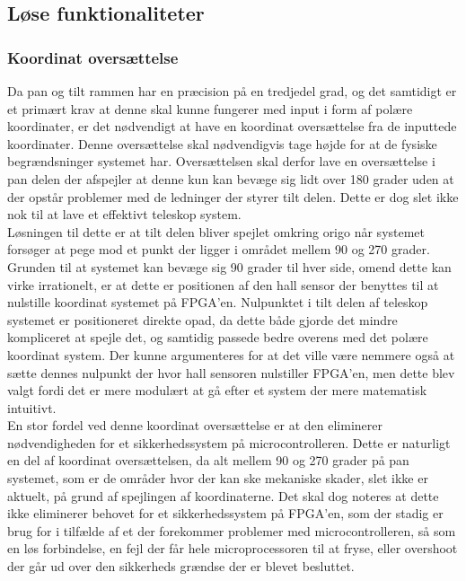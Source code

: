 \subsection{Løse funktionaliteter}

\subsubsection{Koordinat oversættelse}

Da pan og tilt rammen har en præcision på en tredjedel grad, og det samtidigt er et primært krav at denne skal kunne fungerer med input i form af polære koordinater, er det nødvendigt at have en koordinat oversættelse fra de inputtede koordinater. Denne oversættelse skal nødvendigvis tage højde for at de fysiske begrændsninger systemet har. Oversættelsen skal derfor lave en oversættelse i pan delen der afspejler at denne kun kan bevæge sig lidt over 180 grader uden at der opstår problemer med de ledninger der styrer tilt delen. Dette er dog slet ikke nok til at lave et effektivt teleskop system.
\\
Løsningen til dette er at tilt delen bliver spejlet omkring origo når systemet forsøger at pege mod et punkt der ligger i området mellem 90 og 270 grader. Grunden til at systemet kan bevæge sig 90 grader til hver side, omend dette kan virke irrationelt, er at dette er positionen af den hall sensor der benyttes til at nulstille koordinat systemet på FPGA'en. Nulpunktet i tilt delen af teleskop systemet er positioneret direkte opad, da dette både gjorde det mindre kompliceret at spejle det, og samtidig passede bedre overens med det polære koordinat system. Der kunne argumenteres for at det ville være nemmere også at sætte dennes nulpunkt der hvor hall sensoren nulstiller FPGA'en, men dette blev valgt fordi det er mere modulært at gå efter et system der mere matematisk intuitivt.
\\
En stor fordel ved denne koordinat oversættelse er at den eliminerer nødvendigheden for et sikkerhedssystem på microcontrolleren. Dette er naturligt en del af koordinat oversættelsen, da alt mellem 90 og 270 grader på pan systemet, som er de områder hvor der kan ske mekaniske skader, slet ikke er aktuelt, på grund af spejlingen af koordinaterne. Det skal dog noteres at dette ikke eliminerer behovet for et sikkerhedssystem på FPGA'en, som der stadig er brug for i tilfælde af et der forekommer problemer med microcontrolleren, så som en løs forbindelse, en fejl der får hele microprocessoren til at fryse, eller overshoot der går ud over den sikkerheds grændse der er blevet besluttet.





















